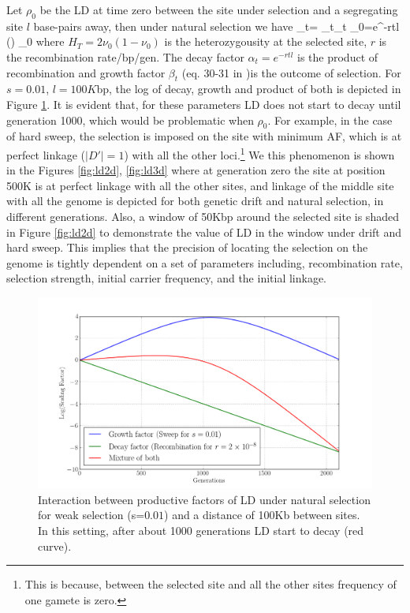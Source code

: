 \documentclass[11pt]{article}
\begin{document}
Let $\rho_0$ be the LD at time zero between the site under selection and a 
segregating site $l$ base-pairs away, then under natural selection we have
\beq
\rho_t= \alpha_t\beta_t \rho_0=e^{-rtl} \left(\right)  
\rho_0\label{eq:ldt}
\eeq
where $H_T=2\nu_0(1-\nu_0)$ is the heterozygousity at the selected site, $r$ is 
the recombination rate/bp/gen. The decay factor $\alpha_t=e^{-rtl}$ is the 
product of recombination and growth factor $\beta_t$ (eq. 30-31 in 
\cite{Stephan2006The})is the outcome of 
selection. For $s=0.01$, $l=100K$bp, the log of decay, growth and product of 
both is depicted in Figure \ref{fig:ldf}. It is evident that, for these 
parameters LD does not start to decay until generation 1000, which would be  
problematic when $\rho_0$. For example, in the case of hard sweep, the 
selection is imposed on the site with minimum AF, which is at perfect linkage 
($|D'|=1$) with all the other loci.\footnote{This is because, between the 
selected site and all the other sites frequency of one gamete is zero.}
We this phenomenon is shown in the Figures \ref{fig:ld2d}, \ref{fig:ld3d} where 
at generation zero the site at position 500K is at perfect linkage with all the 
other sites, and linkage of the middle site with all the genome is depicted 
for both genetic drift and natural selection, in different generations.
Also, a window of 50Kbp around the selected site is shaded in Figure 
\ref{fig:ld2d} to demonstrate the value of LD in the window under drift and 
hard sweep. This implies that the precision of locating the selection on the 
genome is tightly dependent on a set of parameters including, recombination 
rate, selection strength, initial carrier frequency, and the initial linkage.


\begin{figure}
	\centering
	\includegraphics[width=\textwidth]{decayFactors}
	\caption{Interaction between productive factors of LD under natural 
	selection for weak selection (s=$0.01$) and a distance of 100Kb between 
	sites. In this setting, after about 1000 generations LD start to decay (red 
	curve).} \label{fig:ldf}
\end{figure}
\end{document}
